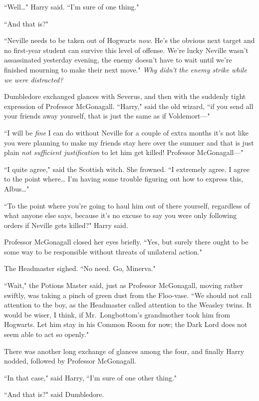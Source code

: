 ``Well{\ldots}" Harry said. ``I'm sure of one thing."

``And that is?"

``Neville needs to be taken out of Hogwarts \emph{now}. He's the obvious next target and no first-year student can survive this level of offense. We're lucky Neville wasn't assassinated yesterday evening, the enemy doesn't have to wait until we're finished mourning to make their next move." \emph{Why didn't the enemy strike while we were distracted?}

Dumbledore exchanged glances with Severus, and then with the suddenly tight expression of Professor McGonagall. ``Harry," said the old wizard, ``if you send all your friends away yourself, that is just the same as if Voldemort---"

``I will be \emph{fine} I can do without Neville for a couple of extra months it's not like you were planning to make my friends stay here over the summer and that is just plain \emph{not sufficient justification} to let him get killed! Professor McGonagall---"

``I quite agree," said the Scottish witch. She frowned. ``I extremely agree. I agree to the point where{\ldots} I'm having some trouble figuring out how to express this, Albus{\ldots}"

``To the point where you're going to haul him out of there yourself, regardless of what anyone else says, because it's no excuse to say you were only following orders if Neville gets killed?" Harry said.

Professor McGonagall closed her eyes briefly. ``Yes, but surely there ought to be some way to be responsible without threats of unilateral action."

The Headmaster sighed. ``No need. Go, Minerva."

``Wait," the Potions Master said, just as Professor McGonagall, moving rather swiftly, was taking a pinch of green dust from the Floo-vase. ``We should not call attention to the boy, as the Headmaster called attention to the Weasley twins. It would be wiser, I think, if Mr.~Longbottom's grandmother took him from Hogwarts. Let him stay in his Common Room for now; the Dark Lord does not seem able to act so openly."

There was another long exchange of glances among the four, and finally Harry nodded, followed by Professor McGonagall.

``In that case," said Harry, ``I'm sure of one other thing."

``And that is?" said Dumbledore.

